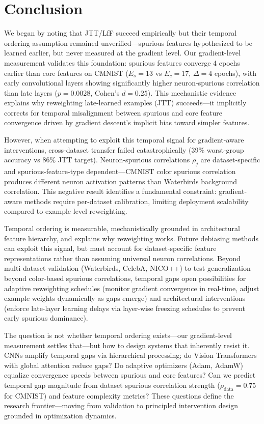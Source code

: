 \section{Conclusion}
\label{sec:conclusion}

We began by noting that JTT/LfF succeed empirically but their temporal ordering assumption remained unverified---spurious features hypothesized to be learned earlier, but never measured at the gradient level. Our gradient-level measurement validates this foundation: spurious features converge 4 epochs earlier than core features on CMNIST ($E_s=13$ vs $E_c=17$, $\Delta=4$ epochs), with early convolutional layers showing significantly higher neuron-spurious correlation than late layers ($p=0.0028$, Cohen's $d=0.25$). This mechanistic evidence explains why reweighting late-learned examples (JTT) succeeds---it implicitly corrects for temporal misalignment between spurious and core feature convergence driven by gradient descent's implicit bias toward simpler features.

However, when attempting to exploit this temporal signal for gradient-aware interventions, cross-dataset transfer failed catastrophically (39\% worst-group accuracy vs 86\% JTT target). Neuron-spurious correlations $\rho_j$ are dataset-specific and spurious-feature-type dependent---CMNIST color spurious correlation produces different neuron activation patterns than Waterbirds background correlation. This negative result identifies a fundamental constraint: gradient-aware methods require per-dataset calibration, limiting deployment scalability compared to example-level reweighting.

Temporal ordering is measurable, mechanistically grounded in architectural feature hierarchy, and explains why reweighting works. Future debiasing methods can exploit this signal, but must account for dataset-specific feature representations rather than assuming universal neuron correlations. Beyond multi-dataset validation (Waterbirds, CelebA, NICO++) to test generalization beyond color-based spurious correlations, temporal gaps open possibilities for adaptive reweighting schedules (monitor gradient convergence in real-time, adjust example weights dynamically as gaps emerge) and architectural interventions (enforce late-layer learning delays via layer-wise freezing schedules to prevent early spurious dominance).

The question is not whether temporal ordering exists---our gradient-level measurement settles that---but how to design systems that inherently resist it. CNNs amplify temporal gaps via hierarchical processing; do Vision Transformers with global attention reduce gaps? Do adaptive optimizers (Adam, AdamW) equalize convergence speeds between spurious and core features? Can we predict temporal gap magnitude from dataset spurious correlation strength ($\rho_{\text{data}}=0.75$ for CMNIST) and feature complexity metrics? These questions define the research frontier---moving from validation to principled intervention design grounded in optimization dynamics.

